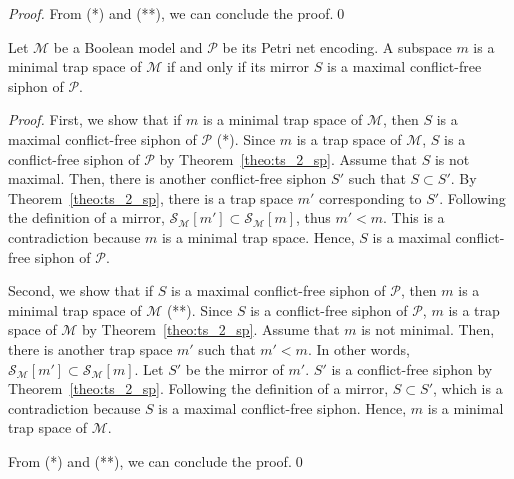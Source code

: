 \documentclass[runningheads]{llncs}
\begin{document}
\begin{proof}
  From (*) and (**), we can conclude the proof.\qed%
\end{proof}

\begin{theorem}%
\label{theo:min_ts_2_max_sp}

  Let \(\mathcal{M}\) be a Boolean model and \(\mathcal{P}\) be its Petri net encoding. A subspace \(m\) is a minimal trap space of \(\mathcal{M}\) if and only if its mirror \(S\) is a maximal conflict-free siphon of \(\mathcal{P}\).

\end{theorem}

\begin{proof}

  First, we show that if \(m\) is a minimal trap space of \(\mathcal{M}\), then \(S\) is a maximal conflict-free siphon of \(\mathcal{P}\) (*). Since \(m\) is a trap space of \(\mathcal{M}\), \(S\) is a conflict-free siphon of \(\mathcal{P}\) by Theorem~\ref{theo:ts_2_sp}. Assume that \(S\) is not maximal. Then, there is another conflict-free siphon \(S'\) such that \(S \subset S'\). By Theorem~\ref{theo:ts_2_sp}, there is a trap space \(m'\) corresponding to \(S'\). Following the definition of a mirror, \(\mathcal{S}_{\mathcal{M}}[m'] \subset \mathcal{S}_{\mathcal{M}}[m]\), thus \(m' < m\). This is a contradiction because \(m\) is a minimal trap space. Hence, \(S\) is a maximal conflict-free siphon of \(\mathcal{P}\).
  
  Second, we show that if \(S\) is a maximal conflict-free siphon of \(\mathcal{P}\), then \(m\) is a minimal trap space of \(\mathcal{M}\) (**). Since \(S\) is a conflict-free siphon of \(\mathcal{P}\), \(m\) is a trap space of \(\mathcal{M}\) by Theorem~\ref{theo:ts_2_sp}. Assume that \(m\) is not minimal. Then, there is another trap space \(m'\) such that \(m' < m\). In other words, \(\mathcal{S}_{\mathcal{M}}[m'] \subset \mathcal{S}_{\mathcal{M}}[m]\). Let \(S'\) be the mirror of \(m'\). \(S'\) is a conflict-free siphon by Theorem~\ref{theo:ts_2_sp}. Following the definition of a mirror, \(S \subset S'\), which is a contradiction because \(S\) is a maximal conflict-free siphon. Hence, \(m\) is a minimal trap space of \(\mathcal{M}\).
  
  From (*) and (**), we can conclude the proof.\qed%
\end{proof}
\end{document}
